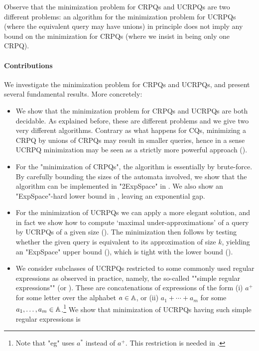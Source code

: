 Observe that the minimization problem for CRPQs and UCRPQs are two different problems: an algorithm for the minimization problem for UCRPQs (where the equivalent query may have unions) in principle does not imply any bound on the minimization for CRPQs (where we insist in being only one CRPQ). 

\paragraph{Contributions}
We investigate the minimization problem for CRPQs and UCRPQs, and present several fundamental results. More concretely:
\begin{itemize}
	\item We show that the minimization problem for CRPQs and UCRPQs are both decidable. As explained before, these are different problems  and we give two very different algorithms. Contrary as what happens for CQs, minimizing a CRPQ by unions of CRPQs may result in smaller queries, hence in a sense UCRPQ minimization may be seen as a strictly more powerful approach ().
	\item For the "minimization of CRPQs", the algorithm is essentially by brute-force. By carefully bounding the sizes of the automata involved, we show that the algorithm can be implemented in "2ExpSpace" in . We also show an "ExpSpace"-hard lower bound in , leaving an exponential gap.
	\item For the minimization of UCRPQs we can apply a more elegant solution, and in fact we show how to compute `maximal under-approximations' of a query by UCRPQs of a given size (). The minimization then follows by testing whether the given query is equivalent to its approximation of size $k$, yielding an "ExpSpace" upper bound (), which is tight with the lower bound ().
	\item We consider subclasses of UCRPQs restricted to some commonly used regular expressions as observed in practice, namely, the so-called \AP""simple regular expressions"" (or ). These are concatenations of expressions of the form
			(i) $a^+$ for some letter over the alphabet $a \in \mathbb{A}$, or 
			(ii) $a_1 + \dotsb + a_m$ for some $a_1, \dotsc, a_m \in \mathbb{A}$.\footnote{Note that "eg" \cite[\S 6]{FM2023semantic} uses $a^*$ instead of $a^+$. This restriction is needed in .}
		We show that minimization of UCRPQs having such simple regular expressions is

\end{itemize}
